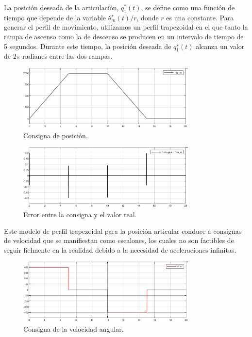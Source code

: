 \documentclass{article}
\begin{document}
La posición deseada de la articulación, $q^*_1(t)$, se define como una función de tiempo que depende 
de la variable $θ^∗_m(t)/r$, donde $r$ es una constante. Para generar el perfil de movimiento, 
utilizamos un perfil trapezoidal en el que tanto la rampa de ascenso como la de descenso se producen 
en un intervalo de tiempo de 5 segundos. Durante este tiempo, la posición deseada de $q^∗_1(t)$ alcanza 
un valor de $2\pi$ radianes entre las dos rampas.

\begin{figure}[H]
    \centering
    \includegraphics[width=0.8\textwidth]{5.2.4.a.1.png}
    \caption{Consigna de posición.}
\end{figure}

\begin{figure}[H]
    \centering
    \includegraphics[width=0.8\textwidth]{5.2.4.a.2.png}
    \caption{Error entre la consigna y el valor real.}
\end{figure}

Este modelo de perfil trapezoidal para la posición articular conduce a consignas de velocidad 
que se manifiestan como escalones, los cuales no son factibles de seguir fielmente en la realidad 
debido a la necesidad de aceleraciones infinitas.

\begin{figure}[H]
    \centering
    \includegraphics[width=0.8\textwidth]{5.2.4.a.3.png}
    \caption{Consigna de la velocidad angular.}
\end{figure}
\end{document}
